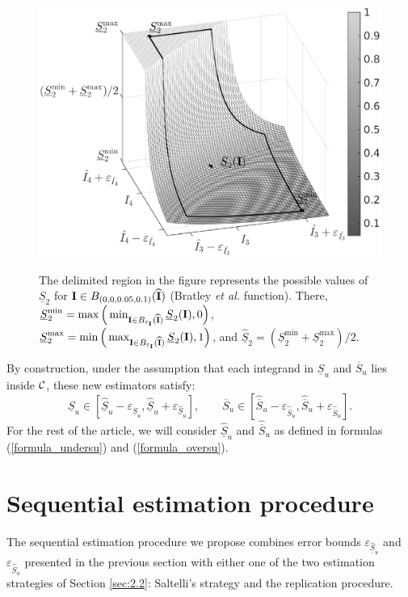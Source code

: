 \begin{figure}[t]
\caption{The delimited region in the figure represents the possible values of $\underline{S}_2$ for $\boldsymbol{\mathbf{I}}\in B_{(0,0,0.05,0.1)}(\widehat{\boldsymbol{\mathbf{I}}})$ (Bratley \textit{et al.} function). There, $\underline{S}_2^{\min}=\max\Big{(}\min_{\boldsymbol{\mathbf{I}}\in B_{\varepsilon_{\boldsymbol{\mathbf{I}}}}(\widehat{\boldsymbol{\mathbf{I}}})} \underline{S}_2(\boldsymbol{\mathbf{I}}),0\Big{)}$, $\underline{S}_2^{\max}=\min\Big{(}\max_{\boldsymbol{\mathbf{I}}\in B_{\varepsilon_{\boldsymbol{\mathbf{I}}}}(\widehat{\boldsymbol{\mathbf{I}}})} \underline{S}_2(\boldsymbol{\mathbf{I}}),1\Big{)}$, and $\widehat{\underline{S}}_2=(\underline{S}_2^{\min}+\underline{S}_2^{\max})/2$.}
\centering
\includegraphics[width=.45\textwidth]{estimator_3d_small.eps}
\label{fig:1}       %
\end{figure}

By construction, under the assumption that each integrand in $\underline{S}_u$ and $\overline{S}_u$ lies inside $\mathcal{C}$, these new estimators satisfy: \[ \underline{S}_u\in \left[ \widehat{\underline{S}}_u - \varepsilon_{\widehat{\underline{S}}_u}, \widehat{\underline{S}}_u + \varepsilon_{\widehat{\underline{S}}_u} \right], \qquad \overline{S}_u\in \left[ \widehat{\overline{S}}_u - \varepsilon_{\widehat{\overline{S}}_u}, \widehat{\overline{S}}_u + \varepsilon_{\widehat{\overline{S}}_u} \right] .\]
 For the rest of the article, we will consider $\widehat{\underline{S}}_u$ and $\widehat{\overline{S}}_u$ as defined in formulas (\ref{formula_undersu}) and (\ref{formula_oversu}).

\section{Sequential estimation procedure}
\label{sec:4}
The sequential estimation procedure we propose combines error bounds $\varepsilon_{\widehat{\underline{S}}_u}$ and $\varepsilon_{\widehat{\overline{S}}_u}$ presented in the previous section with either one of the two estimation strategies of Section \ref{sec:2.2}: Saltelli's strategy and the replication procedure. 

